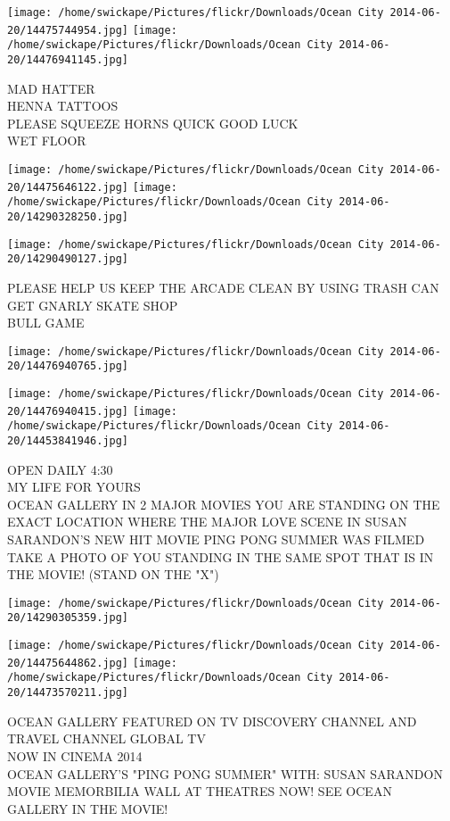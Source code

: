 \documentclass[10pt,letterpaper]{article}
\begin{document}
\texttt{[image: /home/swickape/Pictures/flickr/Downloads/Ocean City 2014-06-20/14475744954.jpg]}
\texttt{[image: /home/swickape/Pictures/flickr/Downloads/Ocean City 2014-06-20/14476941145.jpg]}

MAD HATTER\\
HENNA TATTOOS\\
PLEASE SQUEEZE HORNS QUICK GOOD LUCK\\
WET FLOOR
\pagebreak

\texttt{[image: /home/swickape/Pictures/flickr/Downloads/Ocean City 2014-06-20/14475646122.jpg]}
\texttt{[image: /home/swickape/Pictures/flickr/Downloads/Ocean City 2014-06-20/14290328250.jpg]}

\texttt{[image: /home/swickape/Pictures/flickr/Downloads/Ocean City 2014-06-20/14290490127.jpg]}

PLEASE HELP US KEEP THE ARCADE CLEAN BY USING TRASH CAN\\
GET GNARLY SKATE SHOP\\
BULL GAME
\pagebreak

\texttt{[image: /home/swickape/Pictures/flickr/Downloads/Ocean City 2014-06-20/14476940765.jpg]}

\vspace{0.25in}
\texttt{[image: /home/swickape/Pictures/flickr/Downloads/Ocean City 2014-06-20/14476940415.jpg]}
\texttt{[image: /home/swickape/Pictures/flickr/Downloads/Ocean City 2014-06-20/14453841946.jpg]}

OPEN DAILY 4:30\\
MY LIFE FOR YOURS\\
OCEAN GALLERY IN 2 MAJOR MOVIES YOU ARE STANDING ON THE EXACT LOCATION WHERE THE MAJOR LOVE SCENE IN SUSAN SARANDON'S NEW HIT MOVIE PING PONG SUMMER WAS FILMED TAKE A PHOTO OF YOU STANDING IN THE SAME SPOT THAT IS IN THE MOVIE!  (STAND ON THE "X")
\pagebreak

\texttt{[image: /home/swickape/Pictures/flickr/Downloads/Ocean City 2014-06-20/14290305359.jpg]}

\vspace{0.25in}
\texttt{[image: /home/swickape/Pictures/flickr/Downloads/Ocean City 2014-06-20/14475644862.jpg]}
\texttt{[image: /home/swickape/Pictures/flickr/Downloads/Ocean City 2014-06-20/14473570211.jpg]}

OCEAN GALLERY FEATURED ON TV DISCOVERY CHANNEL AND TRAVEL CHANNEL GLOBAL TV\\
NOW IN CINEMA 2014\\
OCEAN GALLERY'S "PING PONG SUMMER" WITH: SUSAN SARANDON MOVIE MEMORBILIA WALL AT THEATRES NOW!  SEE OCEAN GALLERY IN THE MOVIE!
\pagebreak
\end{document}
